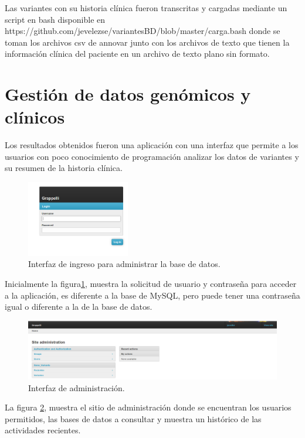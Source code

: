 Las variantes con su historia clínica fueron transcritas y cargadas mediante un script en bash disponible en https://github.com/jevelezse/variantesBD/blob/master/carga.bash donde se toman los archivos csv de annovar junto con los archivos de texto que tienen la información clínica del paciente en un archivo de texto plano sin formato. 

\section{Gestión de datos genómicos y clínicos}

Los resultados obtenidos fueron una aplicación con una interfaz que permite a los usuarios con poco conocimiento de  programación  analizar los datos de variantes y su resumen de la historia clínica. \\

\begin{figure}[H] 
	\centering
	\includegraphics[width=0.4\textwidth]{Kap3/admin_django}
	\caption{Interfaz de ingreso para  administrar la base de datos. } \label{fig:admin}
\end{figure}

Inicialmente la figura\ref{fig:admin}, muestra la solicitud de usuario y contraseña para acceder a la aplicación, es diferente a la base de MySQL, pero  puede tener  una contraseña igual o diferente a la de la base de datos. \\

\begin{figure}[H] 
	\centering
	\includegraphics[width=1\textwidth]{Kap3/django_admin}
	\caption{Interfaz de administración. } \label{fig:admin2}
\end{figure}

La figura \ref{fig:admin2}, muestra el sitio de administración donde se encuentran los usuarios permitidos, las bases de datos a consultar y muestra un histórico de las actividades recientes. \\

